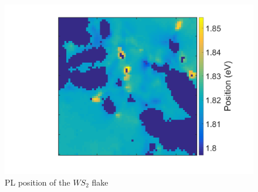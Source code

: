 \begin{figure}[h]
	\begin{center}
		\includegraphics[scale=0.3]{Heterostructures/PLPositionMap22.png}
		\caption{PL position of the $WS_2$ flake}
		\label{fig:HeterostructuresPLPosition22Map}
	\end{center}
\end{figure}

